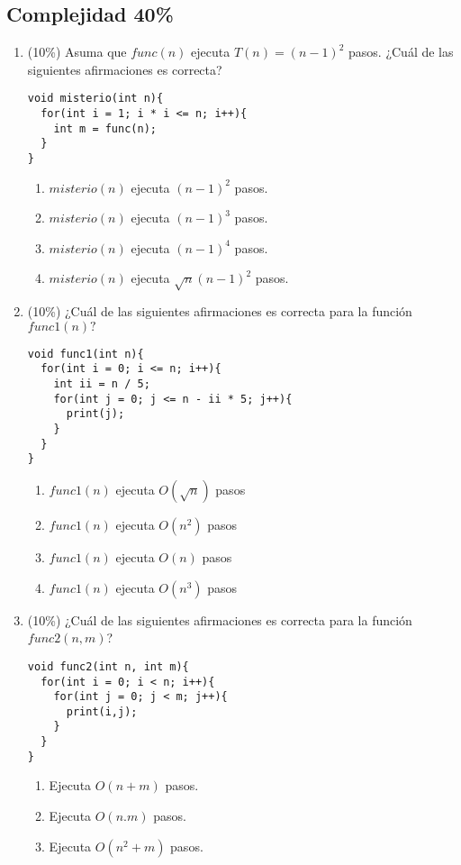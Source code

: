 \documentclass[10 pt]{article}
\begin{document}
\begin{multicols}{2}
\section{Complejidad 40\%}
\begin{enumerate}[label=\alph*]
\item (10\%) Asuma que $func(n)$ ejecuta $T(n) = (n - 1)^2$ pasos. ¿Cuál de las siguientes afirmaciones es correcta?
\begin{lstlisting}
void misterio(int n){
  for(int i = 1; i * i <= n; i++){
    int m = func(n);
  }
}
\end{lstlisting}
\begin{enumerate}[label=(\roman*)]
\item $misterio(n)$ ejecuta  $(n - 1)^2$ pasos.
\item $misterio(n)$ ejecuta  $(n - 1)^3$ pasos.
\item $misterio(n)$ ejecuta  $(n - 1)^4$ pasos.
\item $misterio(n)$ ejecuta  $\sqrt{n}(n - 1)^2$ pasos.
\end{enumerate} 
\item (10\%) ¿Cuál de las siguientes afirmaciones es correcta para la función $func1(n)?$
\begin{lstlisting}
void func1(int n){
  for(int i = 0; i <= n; i++){
    int ii = n / 5;
    for(int j = 0; j <= n - ii * 5; j++){
      print(j);
    }    
  }
}
\end{lstlisting}
\begin{enumerate}[label=\roman*]
\item $func1(n)$ ejecuta $O(\sqrt{n})$ pasos
\item $func1(n)$ ejecuta $O(n^2)$ pasos
\item $func1(n)$ ejecuta $O(n)$ pasos
\item $func1(n)$ ejecuta $O(n^3)$ pasos
\end{enumerate} 
\item (10\%) ¿Cuál de las siguientes afirmaciones es correcta para la función $func2(n, m)$?
\begin{lstlisting}
void func2(int n, int m){
  for(int i = 0; i < n; i++){
    for(int j = 0; j < m; j++){
      print(i,j);   
    }  
  }
}
\end{lstlisting}
\begin{enumerate}[label=\roman*]
\item Ejecuta $O(n + m)$ pasos.
\item Ejecuta $O(n . m)$ pasos.
\item Ejecuta $O(n^2 + m)$ pasos.

\end{enumerate}
\end{enumerate}
\end{multicols}
\end{document}
